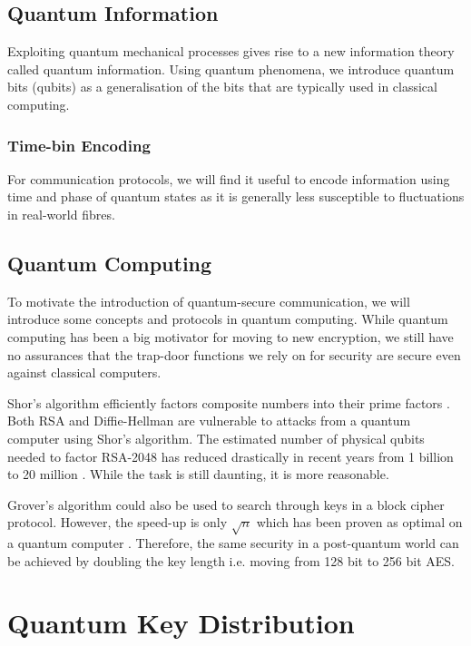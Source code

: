 \subsection{Quantum Information}

Exploiting quantum mechanical processes gives rise to a new information theory called {\textcolor{bristol-red} quantum information}. Using quantum phenomena, we introduce quantum bits (qubits) as a generalisation of the bits that are typically used in classical computing.

\subsubsection{Time-bin Encoding}

For communication protocols, we will find it useful to encode information using time and phase of quantum states as it is generally less susceptible to fluctuations in real-world fibres.

\subsection{Quantum Computing}

To motivate the introduction of quantum-secure communication, we will introduce some concepts and protocols in quantum computing. While quantum computing has been a big motivator for moving to new encryption, we still have no assurances that the trap-door functions we rely on for security are secure even against classical computers.

Shor's algorithm efficiently factors composite numbers into their prime factors \cite{shor1994}. Both RSA and Diffie-Hellman are vulnerable to attacks from a quantum computer using Shor's algorithm. The estimated number of physical qubits needed to factor RSA-2048 has reduced drastically in recent years from 1 billion \cite{mosca2018, fowler2012} to 20 million \cite{gidney2019}. While the task is still daunting, it is more reasonable.

Grover's algorithm could also be used to search through keys in a block cipher protocol. However, the speed-up is only $\sqrt{n}$ which has been proven as optimal on a quantum computer \cite{Bennent1997} . Therefore, the same security in a post-quantum world can be achieved by doubling the key length i.e. moving from 128 bit to 256 bit AES.

\section{Quantum Key Distribution}

